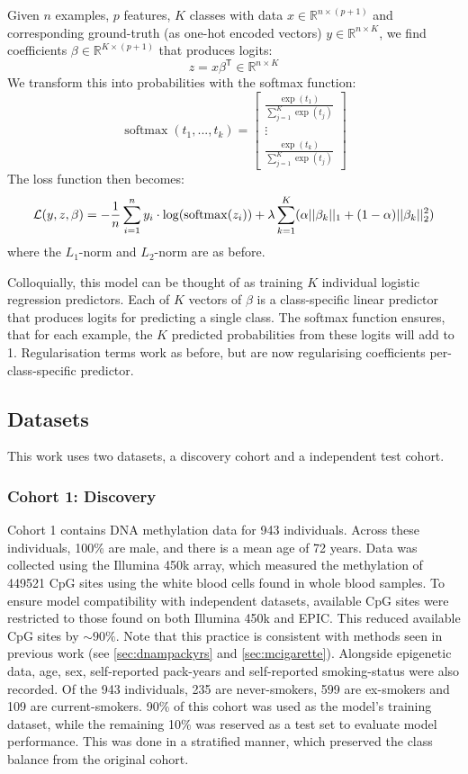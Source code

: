 \documentclass{article}
\DeclareMathOperator*{\softmax}{softmax}
\newcommand{\equationname}[1]{%
    \begingroup
        \leavevmode
        \addcontentsline{equ}{equations}{\protect\numberline{\theequation}#1}%
    \endgroup   
}
\begin{document}
Given \(n\) examples, \(p\) features, \(K\) classes with data \(x \in \mathbb{R}^{n \times (p + 1)}\) and corresponding ground-truth (as one-hot encoded vectors) \(y \in \mathbb{R}^{n \times K}\), we find coefficients \(\beta \in \mathbb{R}^{K \times (p + 1)}\) that produces logits:
\[z = x \beta^\mathsf{T} \in \mathbb{R}^{n \times K}\]
We transform this into probabilities with the softmax function:
\[\softmax(t_1,... , t_k) =
    \begin{bmatrix}
        \frac{\exp(t_1)}{\sum_{j=1}^{K} \exp(t_j)} \\
        \vdots                                     \\
        \frac{\exp(t_k)}{\sum_{j=1}^{K} \exp(t_j)}
    \end{bmatrix}
\]
The loss function then becomes:
\begin{equation} \equationname{Elastic Net logistic regression}
    \mathcal{L}(y, z, \beta) = -\frac{1}{n}\sum_{i=1}^{n} y_i \cdot \log(\softmax(z_i)) + \lambda\sum_{k=1}^{K}(\alpha||\beta_k||_1 + (1 - \alpha)||\beta_k||_2^2)
\end{equation}
where the \(L_1\)-norm and \(L_2\)-norm are as before.

Colloquially, this model can be thought of as training \(K\) individual logistic regression predictors. Each of \(K\) vectors of \(\beta\) is a class-specific linear predictor that produces logits for predicting a single class. The softmax function ensures, that for each example, the \(K\) predicted probabilities from these logits will add to 1. Regularisation terms work as before, but are now regularising coefficients per-class-specific predictor.

\subsection{Datasets}
This work uses two datasets, a discovery cohort and a independent test cohort.

\subsubsection{Cohort 1: Discovery}
Cohort 1 contains DNA methylation data for 943 individuals. Across these individuals, 100\% are male, and there is a mean age of 72 years. Data was collected using the Illumina 450k array, which measured the methylation of \num{449521} CpG sites using the white blood cells found in whole blood samples. To ensure model compatibility with independent datasets, available CpG sites were restricted to those found on both Illumina 450k and EPIC. This reduced available CpG sites by \(\sim\!90\%\). Note that this practice is consistent with methods seen in previous work (see \ref{sec:dnampackyrs} and \ref{sec:mcigarette}). Alongside epigenetic data, age, sex, self-reported pack-years and self-reported smoking-status were also recorded. Of the 943 individuals, 235 are never-smokers, 599 are ex-smokers and 109 are current-smokers. 90\% of this cohort was used as the model's training dataset, while the remaining 10\% was reserved as a test set to evaluate model performance. This was done in a stratified manner, which preserved the class balance from the original cohort.
\end{document}

